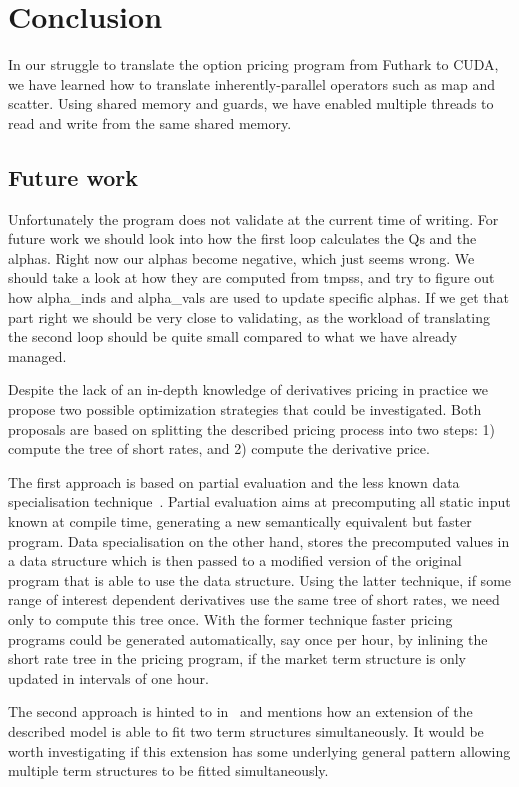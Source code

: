 \section{Conclusion}
In our struggle to translate the option pricing program from
Futhark to CUDA, we have learned how to translate inherently-parallel
operators such as map and scatter. Using shared memory and guards,
we have enabled multiple threads to read and write from the same
shared memory.

\subsection{Future work}

Unfortunately the program does not validate at the current
time of writing. For future work we should look into how
the first loop calculates the Qs and the alphas.
Right now our alphas become negative, which just seems wrong.
We should take a look at how they are computed from tmpss,
and try to figure out how alpha\_inds and alpha\_vals are
used to update specific alphas. If we get that part right
we should be very close to validating, as the workload of
translating the second loop should be quite small compared
to what we have already managed.

Despite the lack of an in-depth knowledge of derivatives
pricing in practice we propose two possible optimization
strategies that could be investigated. Both proposals are
based on splitting the described pricing process into two
steps: 1) compute the tree of short rates, and 2) compute
the derivative price.

The first approach is based on partial evaluation and the
less known data specialisation
technique~\cite{malmkjaer,chirokoff}. Partial evaluation
aims at precomputing all static input known at compile time,
generating a new semantically equivalent but faster
program. Data specialisation on the other hand, stores the
precomputed values in a data structure which is then passed
to a modified version of the original program that is able
to use the data structure. Using the latter technique, if some
range of interest dependent derivatives use the same tree of
short rates, we need only to compute this tree once. With
the former technique faster pricing programs could be
generated automatically, say once per hour, by inlining the
short rate tree in the pricing program, if the market term
structure is only updated in intervals of one hour.

The second approach is hinted to in~\cite{HullWhite94} and
mentions how an extension of the described model is able to
fit two term structures simultaneously. It would be worth
investigating if this extension has some underlying general
pattern allowing multiple term structures to be fitted
simultaneously.
